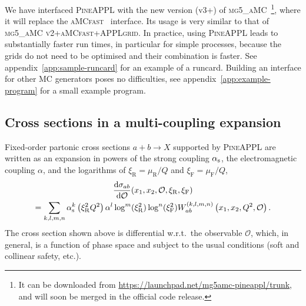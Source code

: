We have interfaced \textsc{PineAPPL} with the new version (v3+) of \textsc{mg5\_aMC}~\cite{Alwall:2014hca,Frederix:2018nkq}\footnote{It can be downloaded from \url{https://launchpad.net/mg5amc-pineappl/trunk}, and will soon be merged in the official code release.}, where it will replace the \textsc{aMCfast}~\cite{Bertone:2014zva} interface.
Its usage is very similar to that of \textsc{mg5\_aMC v2}+\textsc{aMCfast}+\textsc{APPLgrid}.
In practice, using \textsc{PineAPPL} leads to substantially faster run times, in particular for simple processes, because the grids do not need to be optimised 
and their combination is faster.
See appendix~\ref{app:sample-runcard} for an example of a runcard.
Building an interface for other MC generators poses no difficulties, see appendix~\ref{app:example-program} for a small example program.

\subsection{Cross sections in a multi-coupling expansion}
\label{sec:multi-coupling-expansion}

Fixed-order partonic cross sections $a + b \to X$ supported by \textsc{PineAPPL} are written as an expansion in powers of the strong coupling $\alpha_\mathrm{s}$, the electromagnetic coupling $\alpha$, and the logarithms of $\xi_\mathrm{R} = \mu_\mathrm{R} / Q$ and $\xi_\mathrm{F} = \mu_\mathrm{F} / Q$,
\begin{multline}
\frac{\mathrm{d} \sigma_{ab}}{\mathrm{d} \mathcal{O}} (x_1, x_2, \mathcal{O}, \xi_\mathrm{R}, \xi_\mathrm{F}) \\
= \sum_{k,l,m,n} \alpha_\mathrm{s}^k \left( \xi_\mathrm{R}^2 Q^2 \right) \alpha^l \log^m ( \xi_\mathrm{R}^2 ) \log^n ( \xi_\mathrm{F}^2 ) W_{ab}^{(k,l,m,n)} \left( x_1, x_2, Q^2, \mathcal{O} \right) \text{.}
\label{eq:expansion}
\end{multline}
The cross section shown above is differential w.r.t.\ the observable $\mathcal{O}$, which, in general, is a function of phase space and subject to the usual conditions (soft and collinear safety, etc.).

